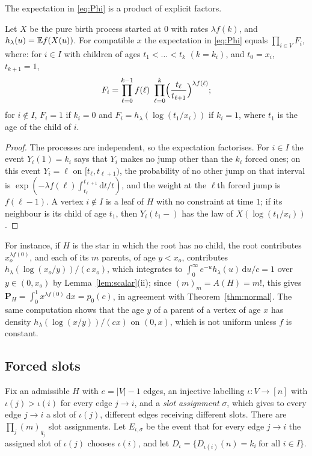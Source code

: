The expectation in \eqref{eq:Phi} is a product of explicit factors.

\begin{proposition}\label{prop:factors}
Let $X$ be the pure birth process started at $0$ with rates $\lambda f(k)$, and $h_\lambda(u)=\mathbb{E} f(X(u))$. For
compatible $x$ the expectation in \eqref{eq:Phi} equals $\prod_{i\in V}F_i$, where:
for $i\in I$ with children of ages $t_1<\dots<t_k$ $(k=k_i)$, and $t_0=x_i$, $t_{k+1}=1$,
\[
   F_i=\prod_{\ell=0}^{k-1}f(\ell)\ \prod_{\ell=0}^{k}\Bigl(\frac{t_\ell}{t_{\ell+1}}\Bigr)^{\lambda f(\ell)};
\]
for $i\notin I$, $F_i=1$ if $k_i=0$ and $F_i=h_\lambda(\log(t_1/x_i))$ if $k_i=1$, where $t_1$ is the age of the
child of $i$.
\end{proposition}

\begin{proof}
The processes are independent, so the expectation factorises. For $i\in I$ the event $Y_i(1)=k_i$ says that
$Y_i$ makes no jump other than the $k_i$ forced ones; on this event $Y_i=\ell$ on $[t_\ell,t_{\ell+1})$, the
probability of no other jump on that interval is $\exp(-\lambda f(\ell)\int_{t_\ell}^{t_{\ell+1}}\mathrm dt/t)$,
and the weight at the $\ell$th forced jump is $f(\ell-1)$. A vertex $i\notin I$ is a leaf of $H$ with no
constraint at time $1$; if its neighbour is its child of age $t_1$, then $Y_i(t_1-)$ has the law of
$X(\log(t_1/x_i))$.
\end{proof}

For instance, if $H$ is the star in which the root has no child, the root contributes $x_o^{\lambda f(0)}$, and
each of its $m$ parents, of age $y<x_o$, contributes $h_\lambda(\log(x_o/y))/(c\,x_o)$, which integrates to
$\int_0^\infty e^{-u}h_\lambda(u)\,\mathrm du/c=1$ over $y\in(0,x_o)$ by Lemma~\ref{lem:scalar}(ii); since
$(m)_m=A(H)=m!$, this gives $\mathbf P_H=\int_0^1x^{\lambda f(0)}\,\mathrm dx=p_0(c)$, in agreement with
Theorem~\ref{thm:normal}. The same computation shows that the age $y$ of a parent of a vertex of age $x$ has
density $h_\lambda(\log(x/y))/(cx)$ on $(0,x)$, which is not uniform unless $f$ is constant.

\subsection{Forced slots}

Fix an admissible $H$ with $e=|V|-1$ edges, an injective labelling $\iota:V\to[n]$ with $\iota(j)>\iota(i)$ for
every edge $j\to i$, and a \emph{slot assignment} $\sigma$, which gives to every edge $j\to i$ a slot of
$\iota(j)$, different edges receiving different slots. There are $\prod_j(m)_{q_j}$ slot assignments. Let
$E_{\iota,\sigma}$ be the event that for every edge $j\to i$ the assigned slot of $\iota(j)$ chooses
$\iota(i)$, and let $D_\iota=\{D_{\iota(i)}(n)=k_i\ \text{for all }i\in I\}$.

